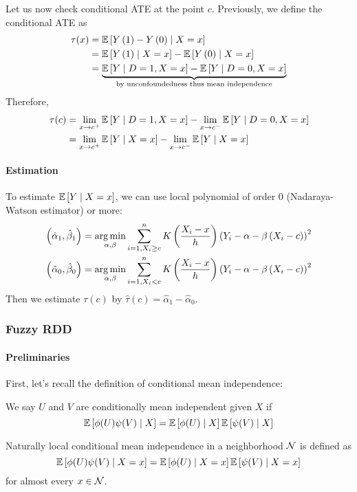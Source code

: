 Let us now check conditional ATE at the point $c$. Previously, we define the conditional ATE as \begin{equation*}
    \begin{split}
        \tau(x) &= \mathbb{E}\left[Y\left(1\right)-Y\left(0\right)\mid X=x\right] \\&= \mathbb{E}\left[Y\left(1\right)\mid X=x\right]-\mathbb{E}\left[Y\left(0\right)\mid X=x\right] \\& =\underbrace{\mathbb{E}\left[Y\mid D=1,X=x\right]-\mathbb{E}\left[Y\mid D=0,X=x\right]}_{\text{by unconfoundedness thus mean independence}} \\
    \end{split}
\end{equation*}
Therefore, \begin{equation}
    \begin{split}
        \tau(c) &= \lim_{x\to c^+}\mathbb{E}\left[Y\mid D=1,X=x\right]-\lim_{x\to c^-}\mathbb{E}\left[Y\mid D=0,X=x\right]\\ &= \lim_{x\to c^+} \mathbb{E}\left[Y\mid X=x\right]-\lim_{x\to c^-}\mathbb{E}\left[Y\mid X=x\right] 
    \end{split}
\end{equation}

\paragraph{Estimation}
To estimate $\mathbb{E}\left[Y\mid X=x\right]$, we can use local polynomial of order 0 (Nadaraya-Watson estimator) or more:
\begin{align*}
    \left(\hat{\alpha}_1,\hat{\beta}_1\right) = \operatorname*{arg\,min}_{\alpha,\beta}\sum_{i=1,X_i\ge c}^n K\left(\frac{X_i-x}{h}\right)\left(Y_i-\alpha-\beta\left(X_i-c\right)\right)^2 \\
    \left(\hat{\alpha}_0,\hat{\beta}_0\right) = \operatorname*{arg\,min}_{\alpha,\beta}\sum_{i=1,X_i< c}^n K\left(\frac{X_i-x}{h}\right)\left(Y_i-\alpha-\beta\left(X_i-c\right)\right)^2 
\end{align*}
Then we estimate $\tau(c)$ by $\hat{\tau}(c) = \hat{\alpha}_1-\hat{\alpha}_0$.
\subsubsection{Fuzzy RDD}
\paragraph{Preliminaries}
First, let's recall the definition of conditional mean independence:
\begin{definition}
    We say $U$ and $V$ are conditionally mean independent given $X$ if \begin{equation*}
        \mathbb{E}\left[\phi(U)\psi(V)\mid X\right] = \mathbb{E}\left[\phi(U)\mid X\right]\mathbb{E}\left[\psi(V)\mid X\right]
    \end{equation*}
\end{definition} Naturally local conditional mean independence in a neighborhood $\mathcal{N}$ is defined as \begin{equation*}
    \mathbb{E}\left[\phi(U)\psi(V)\mid X=x\right] = \mathbb{E}\left[\phi(U)\mid X=x\right]\mathbb{E}\left[\psi(V)\mid X=x\right]
\end{equation*} for almost every $x\in \mathcal{N}$. 

